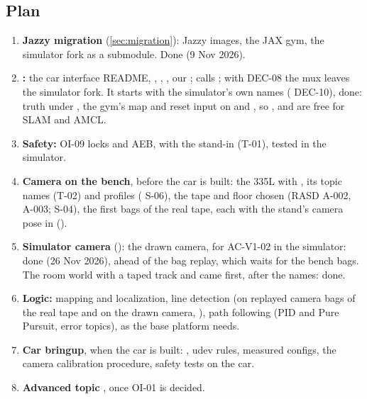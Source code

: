 \documentclass[11pt,a4paper]{article}
\begin{document}
\subsection{Plan}
\begin{enumerate}
  \item \textbf{Jazzy migration} (\cref{sec:migration}): Jazzy images, the JAX gym, the simulator fork as a submodule. Done (9 Nov 2026).
  \item \textbf{:} the car interface README, , , , our ;  calls ; with DEC-08 the mux leaves the simulator fork. It starts with the simulator's own names ( DEC-10), done: truth under , the gym's map and reset input on  and , so ,  and  are free for SLAM and AMCL.
  \item \textbf{Safety:} OI-09 locks and AEB, with the  stand-in (T-01), tested in the simulator.
  \item \textbf{Camera on the bench}, before the car is built: the 335L with , its topic names (T-02) and profiles ( S-06), the tape and floor chosen (RASD A-002, A-003;  S-04), the first bags of the real tape, each with the stand's camera pose in  ().
  \item \textbf{Simulator camera} (): the drawn camera, for AC-V1-02 in the simulator: done (26 Nov 2026), ahead of the bag replay, which waits for the bench bags. The room world with a taped track and  came first, after the  names: done.
  \item \textbf{Logic:} mapping and localization, line detection (on replayed camera bags of the real tape and on the drawn camera, ), path following (PID and Pure Pursuit, error topics), as the base platform needs.
  \item \textbf{Car bringup}, when the car is built: , udev rules, measured configs, the camera calibration procedure, safety tests on the car.
  \item \textbf{Advanced topic} , once OI-01 is decided.
\end{enumerate}
\end{document}
